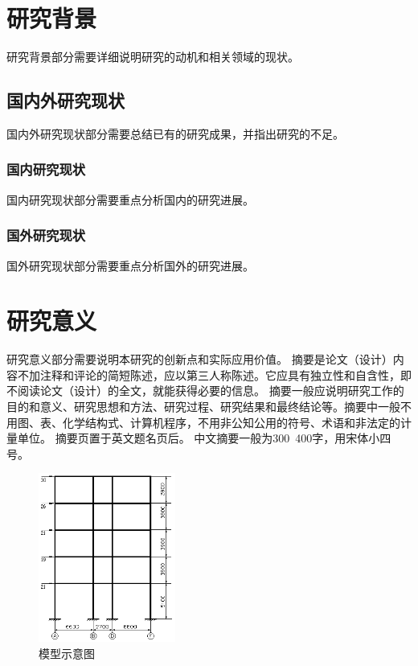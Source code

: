 \documentclass{document}
\begin{document}
\pagestyle{essaystyle}


\section{研究背景}
研究背景部分需要详细说明研究的动机和相关领域的现状。

\subsection{国内外研究现状}
国内外研究现状部分需要总结已有的研究成果，并指出研究的不足。

\subsubsection{国内研究现状}
国内研究现状部分需要重点分析国内的研究进展。

\subsubsection{国外研究现状}
国外研究现状部分需要重点分析国外的研究进展。

\section{研究意义}
研究意义部分需要说明本研究的创新点和实际应用价值。
摘要是论文（设计）内容不加注释和评论的简短陈述，应以第三人称陈述。它应具有独立性和自含性，即不阅读论文（设计）的全文，就能获得必要的信息。
摘要一般应说明研究工作的目的和意义、研究思想和方法、研究过程、研究结果和最终结论等。摘要中一般不用图、表、化学结构式、计算机程序，不用非公知公用的符号、术语和非法定的计量单位。\cite{YXXY20250307001}
摘要页置于英文题名页后。 
中文摘要一般为300~400字，用宋体小四号。

\begin{figure}[htbp]
    \centering
    \includegraphics[width=0.4\textwidth]{assets/images/image.png}
    \caption{模型示意图}
    \label{fig:model}%
\end{figure}
\end{document}
